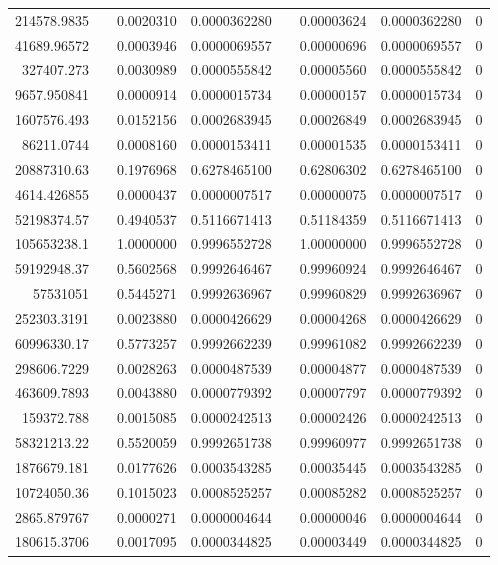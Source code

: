 \documentclass[
journal=jacsat, %
manuscript=article]{achemso}
\begin{document}
\begin{table}[htbp]
{\begin{tabular}{rrrrrrrr}
    214578.9835 &       & 0.0020310 & 0.0000362280 &       & 0.00003624 & 0.0000362280 & 0 \\
    41689.96572 &       & 0.0003946 & 0.0000069557 &       & 0.00000696 & 0.0000069557 & 0 \\
    327407.273 &       & 0.0030989 & 0.0000555842 &       & 0.00005560 & 0.0000555842 & 0 \\
    9657.950841 &       & 0.0000914 & 0.0000015734 &       & 0.00000157 & 0.0000015734 & 0 \\
    1607576.493 &       & 0.0152156 & 0.0002683945 &       & 0.00026849 & 0.0002683945 & 0 \\
    86211.0744 &       & 0.0008160 & 0.0000153411 &       & 0.00001535 & 0.0000153411 & 0 \\
    20887310.63 &       & 0.1976968 & 0.6278465100 &       & 0.62806302 & 0.6278465100 & 0 \\
    4614.426855 &       & 0.0000437 & 0.0000007517 &       & 0.00000075 & 0.0000007517 & 0 \\
    52198374.57 &       & 0.4940537 & 0.5116671413 &       & 0.51184359 & 0.5116671413 & 0 \\
    105653238.1 &       & 1.0000000 & 0.9996552728 &       & 1.00000000 & 0.9996552728 & 0 \\
    59192948.37 &       & 0.5602568 & 0.9992646467 &       & 0.99960924 & 0.9992646467 & 0 \\
    57531051 &       & 0.5445271 & 0.9992636967 &       & 0.99960829 & 0.9992636967 & 0 \\
    252303.3191 &       & 0.0023880 & 0.0000426629 &       & 0.00004268 & 0.0000426629 & 0 \\
    60996330.17 &       & 0.5773257 & 0.9992662239 &       & 0.99961082 & 0.9992662239 & 0 \\
    298606.7229 &       & 0.0028263 & 0.0000487539 &       & 0.00004877 & 0.0000487539 & 0 \\
    463609.7893 &       & 0.0043880 & 0.0000779392 &       & 0.00007797 & 0.0000779392 & 0 \\
    159372.788 &       & 0.0015085 & 0.0000242513 &       & 0.00002426 & 0.0000242513 & 0 \\
    58321213.22 &       & 0.5520059 & 0.9992651738 &       & 0.99960977 & 0.9992651738 & 0 \\
    1876679.181 &       & 0.0177626 & 0.0003543285 &       & 0.00035445 & 0.0003543285 & 0 \\
    10724050.36 &       & 0.1015023 & 0.0008525257 &       & 0.00085282 & 0.0008525257 & 0 \\
    2865.879767 &       & 0.0000271 & 0.0000004644 &       & 0.00000046 & 0.0000004644 & 0 \\
    180615.3706 &       & 0.0017095 & 0.0000344825 &       & 0.00003449 &
    0.0000344825 & 0 \\
    \bottomrule
    \end{tabular}%
    }
  \label{tab:addlabel}%
\end{table}%



%
\end{document}
